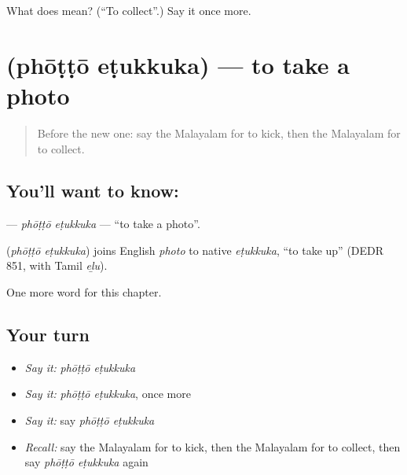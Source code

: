\begin{tcolorbox}[breakable,colback=teal!4,colframe=teal!35!black,title={Before you move on}]
What does  mean? (\textquotedblleft{}To collect\textquotedblright{}.) Say it once more.
\end{tcolorbox}
\section[\texorpdfstring{\ml{ഫോട്ടോ} \ml{എടുക്കുക} (phōṭṭō eṭukkuka)}{ഫോട്ടോ എടുക്കുക (phōṭṭō eṭukkuka)}]{  (phōṭṭō eṭukkuka) — to take a photo}

\label{lesson:ML-C308-photto-etukkuka}



\begin{quote}
Before the new one: say the Malayalam for to kick, then the Malayalam for to collect.
\end{quote}

\subsection*{You'll want to know:  }
\textbf{ } — \emph{phōṭṭō eṭukkuka} — \textquotedblleft{}to take a photo\textquotedblright{}.

\begin{cousinweb}
\textbf{ } (\emph{phōṭṭō eṭukkuka}) joins English \emph{photo} to native \emph{eṭukkuka}, \textquotedblleft{}to take up\textquotedblright{} (DEDR 851, with Tamil \emph{eḻu}).
\end{cousinweb}

\begin{grammarlens}[title={What you've built}]
One more word for this chapter.
\end{grammarlens}

\subsection*{Your turn}
\begin{itemize}
\raggedright
  \item \emph{Say it:} \emph{phōṭṭō eṭukkuka}
  \item \emph{Say it:} \emph{phōṭṭō eṭukkuka}, once more
  \item \emph{Say it:} say \emph{phōṭṭō eṭukkuka}
  \item \emph{Recall:} say the Malayalam for to kick, then the Malayalam for to collect, then say \emph{phōṭṭō eṭukkuka} again
\end{itemize}

